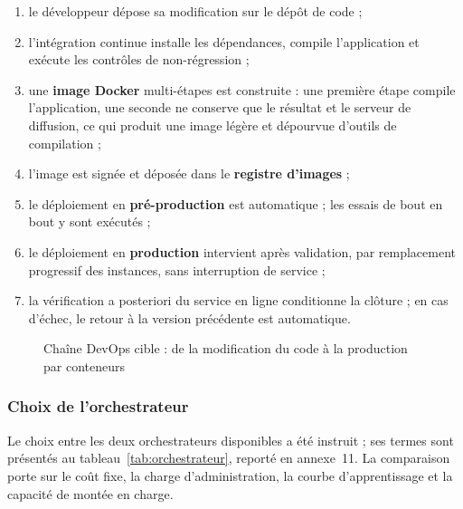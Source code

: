 \begin{enumerate}
  \item le développeur dépose sa modification sur le dépôt de code ;
  \item l'intégration continue installe les dépendances, compile l'application
        et exécute les contrôles de non-régression ;
  \item une \textbf{image Docker} multi-étapes est construite : une première
        étape compile l'application, une seconde ne conserve que le résultat et
        le serveur de diffusion, ce qui produit une image légère et dépourvue
        d'outils de compilation ;
  \item l'image est signée et déposée dans le \textbf{registre d'images} ;
  \item le déploiement en \textbf{pré-production} est automatique ; les essais
        de bout en bout y sont exécutés ;
  \item le déploiement en \textbf{production} intervient après validation, par
        remplacement progressif des instances, sans interruption de service ;
  \item la vérification a posteriori du service en ligne conditionne la
        clôture ; en cas d'échec, le retour à la version précédente est
        automatique.
\end{enumerate}

\begin{figure}[htbp]
\centering
{}
\caption{Chaîne DevOps cible : de la modification du code à la production par conteneurs}
\label{fig:devops-cible}
\end{figure}

\subsubsection{Choix de l'orchestrateur}

Le choix entre les deux orchestrateurs disponibles a été instruit ; ses termes
sont présentés au tableau~\ref{tab:orchestrateur}, reporté en annexe~11. La
comparaison porte sur le coût fixe, la charge d'administration, la courbe
d'apprentissage et la capacité de montée en charge.


